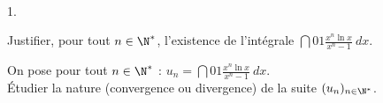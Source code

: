 \documentclass[11pt]{article}%
\begin{document}

\begin{exerciceSP}~
  \begin{noliste}{1.}
    \setlength{\itemsep}{2mm}
  \item Justifier, pour tout $n \in \N^*$, l'existence de l'intégrale
    $\dint{0}{1} \frac{ x^n \ln x }{ x^n - 1 } \ dx$.
  \item On pose pour tout $n \in \N^*$ : $u_n = \dint{0}{1} \frac{ x^n
      \ln x }{ x^n - 1 } \ dx$.\\
    Étudier la nature (convergence ou divergence) de la suite $(u_n)_{
      n \in \N^* }$.
  \end{noliste}
\end{exerciceSP}


\newpage


\end{document}
